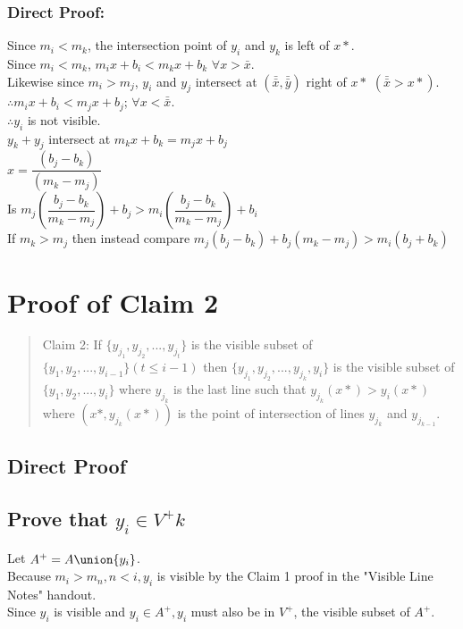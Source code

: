 \documentclass{article}
\begin{document}
    \subsubsection*{Direct Proof:}
    Since $m_i < m_k$, the intersection point of $y_i$ and $y_k$ is left of $x*$.\\
    Since $m_i < m_k$, $m_i x + b_i < m_k x + b_k$ $\forall{x > \bar{x}}$.\\
    Likewise since $m_i > m_j$, $y_i$ and $y_j$ intersect at $(\bar{\bar{x}}, \bar{\bar{y}})$ right of $x*$ $(\bar{\bar{x}} > x*)$.\\
    $\therefore m_i x + b_i < m_j x + b_j$; $\forall{x < \bar{\bar{x}}}$.\\
    $\therefore y_i$ is not visible.\\
    $y_k + y_j$ intersect at $m_k x + b_k = m_j x + b_j$\\
    $x = \dfrac{(b_j - b_k)}{(m_k - m_j)}$\\
    Is $m_j \left( \dfrac{b_j - b_k}{m_k - m_j}\right) + b_j > m_i \left(\dfrac{b_j - b_k}{m_k - m_j}\right) + b_i$\\
    If $m_k > m_j$ then instead compare $m_j (b_j - b_k) + b_j (m_k - m_j) > m_i (b_j + b_k)$

\section*{Proof of Claim 2}

\begin{quote}
Claim 2: If $\{y_{j_1}, y_{j_2},...,y_{j_{t}}\}$ is the visible subset of $\{y_1, y_2,...,y_{i - 1}\} (t \leq i - 1)$ then $\{y_{j_1}, y_{j_2},...,y_{j_{k}}, y_i\}$ is the visible subset of $\{y_1, y_2,...,y_{i}\}$ where $y_{j_{k}}$ is the last line such that $y_{j_{k}} (x*) > y_i (x*)$ where $(x*, y_{j_{k}}(x*))$ is the point of intersection of lines $y_{j_{k}}$ and $y_{j_{k - 1}}$.
\end{quote}

\subsection*{Direct Proof}

\subsection{Prove that $y_{i} \in V^+k$}
Let $A^+ = A \union \{y_i\}$.\\
Because $m_i > m_n, n < i, y_i$ is visible by the Claim 1 proof in the "Visible Line Notes" handout.\\
Since $y_i$ is visible and $y_i \in A^+, y_i$ must also be in $V^+$, the visible subset of $A^+$.
\end{document}
